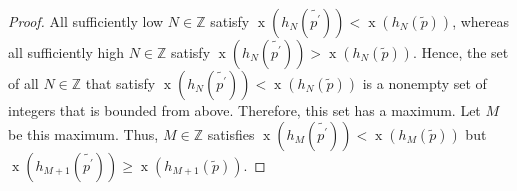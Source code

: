 \documentclass[reqno]{amsart}%
\newcommand{\0}{\phantom{c}}
\newenvironment{verlong}{}{}
\theoremstyle{plain}
\theoremstyle{definition}
\numberwithin{equation}{section}
\begin{document}
\begin{verlong}
\begin{proof}
All sufficiently low $N\in\mathbb{Z}$ satisfy $\operatorname*{x}\left(
h_{N}\left(  \widetilde{p^{\prime}}\right)  \right)  <\operatorname*{x}\left(
h_{N}\left(  \widetilde{p}\right)  \right)  $, whereas all sufficiently high
$N\in\mathbb{Z}$ satisfy $\operatorname*{x}\left(  h_{N}\left(
\widetilde{p^{\prime}}\right)  \right)  >\operatorname*{x}\left(  h_{N}\left(
\widetilde{p}\right)  \right)  $. Hence, the set of all $N\in\mathbb{Z}$ that
satisfy $\operatorname*{x}\left(  h_{N}\left(  \widetilde{p^{\prime}}\right)
\right)  <\operatorname*{x}\left(  h_{N}\left(  \widetilde{p}\right)  \right)
$ is a nonempty set of integers that is bounded from above. Therefore, this
set has a maximum. Let $M$ be this maximum. Thus, $M\in\mathbb{Z}$ satisfies
$\operatorname*{x}\left(  h_{M}\left(  \widetilde{p^{\prime}}\right)  \right)
<\operatorname*{x}\left(  h_{M}\left(  \widetilde{p}\right)  \right)  $ but
$\operatorname*{x}\left(  h_{M+1}\left(  \widetilde{p^{\prime}}\right)
\right)  \geq\operatorname*{x}\left(  h_{M+1}\left(  \widetilde{p}\right)
\right)  $.


\end{proof}
\end{verlong}
\end{document}
